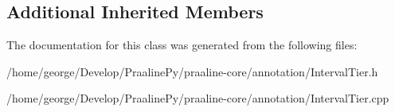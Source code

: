 \subsection*{Additional Inherited Members}


The documentation for this class was generated from the following files\+:\begin{DoxyCompactItemize}
\item 
/home/george/\+Develop/\+Praaline\+Py/praaline-\/core/annotation/Interval\+Tier.\+h\item 
/home/george/\+Develop/\+Praaline\+Py/praaline-\/core/annotation/Interval\+Tier.\+cpp\end{DoxyCompactItemize}
